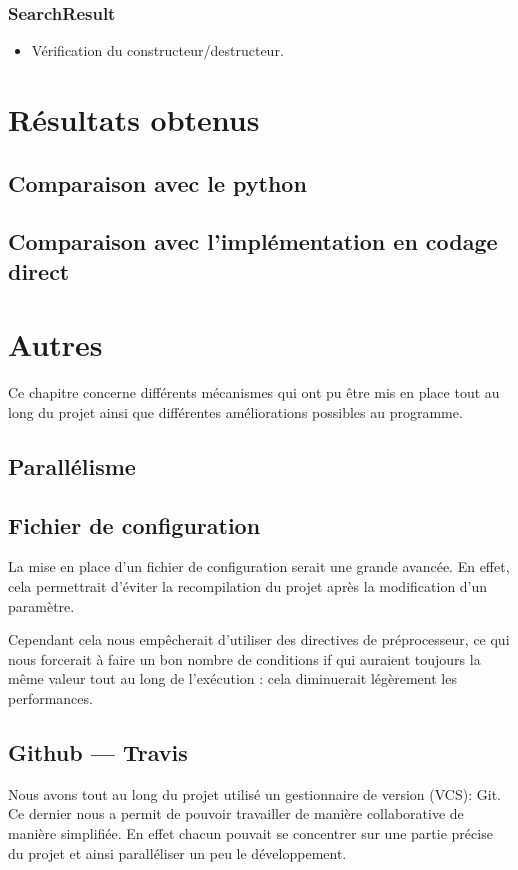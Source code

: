 \documentclass[hideweeklyreports]{polytech/polytech}
\begin{document}
			\subsection{SearchResult}
				\begin{itemize}
					\item Vérification du constructeur/destructeur.
				\end{itemize}
		
	\chapter{Résultats obtenus}
		\section{Comparaison avec le python} %
		\section{Comparaison avec l'implémentation en codage direct} %
	
	\chapter{Autres}
		Ce chapitre concerne différents mécanismes qui ont pu être mis en place tout au long du projet ainsi que différentes améliorations possibles au programme.
		
		\section{Parallélisme} %
		
		\section{Fichier de configuration}
			La mise en place d'un fichier de configuration serait une grande avancée. En effet, cela permettrait d'éviter la recompilation du projet après la modification d'un paramètre.
			
			Cependant cela nous empêcherait d'utiliser des directives de préprocesseur, ce qui nous forcerait à faire un bon nombre de conditions if qui auraient toujours la même valeur tout au long de l'exécution : cela diminuerait légèrement les performances.
		
		\section{Github — Travis}
			Nous avons tout au long du projet utilisé un gestionnaire de version (VCS): Git. Ce dernier nous a permit de pouvoir travailler de manière collaborative de manière simplifiée. En effet chacun pouvait se concentrer sur une partie précise du projet et ainsi paralléliser un peu le développement.
			
\end{document}
